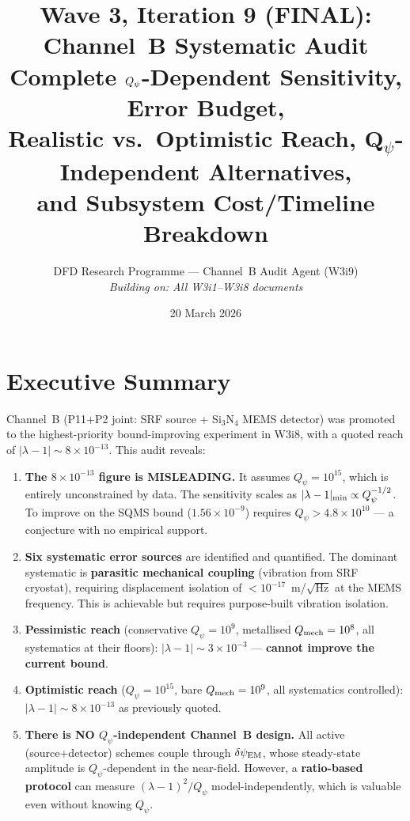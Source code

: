 \documentclass[11pt]{article}
\title{Wave 3, Iteration 9 (FINAL): Channel~B Systematic Audit\\
\large Complete $\Qpsi$-Dependent Sensitivity, Error Budget,\\
Realistic vs.\ Optimistic Reach, Q$_\psi$-Independent Alternatives,\\
and Subsystem Cost/Timeline Breakdown}
\author{DFD Research Programme --- Channel~B Audit Agent (W3i9)\\
\textit{Building on: All W3i1--W3i8 documents}}
\date{20 March 2026}
\newcommand{\lam}{\lambda}
\newcommand{\ee}[1]{\times 10^{#1}}
\newcommand{\Qpsi}{Q_\psi}
\newcommand{\Qmech}{Q_{\rm mech}}
\newcommand{\lbone}{|\lam - 1|}
\newcommand{\dpsiEM}{\delta\psi_{\rm EM}}
\theoremstyle{definition}
\theoremstyle{remark}
\begin{document}
\maketitle
\tableofcontents
\newpage

\section*{Executive Summary}

\begin{tcolorbox}[colback=red!5!white, colframe=red!60!black,
  title=\textbf{W3i9 CHANNEL~B AUDIT --- CRITICAL FINDINGS}]

Channel~B (P11+P2 joint: SRF source + Si$_3$N$_4$ MEMS detector) was
promoted to the highest-priority bound-improving experiment in W3i8,
with a quoted reach of $\lbone \sim 8\ee{-13}$. This audit reveals:

\begin{enumerate}[nosep]
\item \textbf{The $8\ee{-13}$ figure is MISLEADING.} It assumes
  $\Qpsi = 10^{15}$, which is entirely unconstrained by data.
  The sensitivity scales as $\lbone_{\rm min} \propto \Qpsi^{-1/2}$.
  To improve on the SQMS bound ($1.56\ee{-9}$) requires
  $\Qpsi > 4.8\ee{10}$ --- a conjecture with no empirical support.

\item \textbf{Six systematic error sources} are identified and
  quantified. The dominant systematic is \textbf{parasitic mechanical
  coupling} (vibration from SRF cryostat), requiring displacement
  isolation of $< 10^{-17}$~m/$\sqrt{\text{Hz}}$ at the MEMS frequency.
  This is achievable but requires purpose-built vibration isolation.

\item \textbf{Pessimistic reach} (conservative $\Qpsi = 10^{9}$,
  metallised $\Qmech = 10^8$, all systematics at their floors):
  $\lbone \sim 3\ee{-3}$ --- \textbf{cannot improve the current bound}.

\item \textbf{Optimistic reach} ($\Qpsi = 10^{15}$, bare
  $\Qmech = 10^9$, all systematics controlled):
  $\lbone \sim 8\ee{-13}$ as previously quoted.

\item \textbf{There is NO $\Qpsi$-independent Channel~B design.}
  All active (source+detector) schemes couple through $\dpsiEM$,
  whose steady-state amplitude is $\Qpsi$-dependent in the near-field.
  However, a \textbf{ratio-based protocol} can measure
  $(\lam-1)^2/\Qpsi$ model-independently, which is valuable even
  without knowing $\Qpsi$.


\end{enumerate}
\end{tcolorbox}
\end{document}
